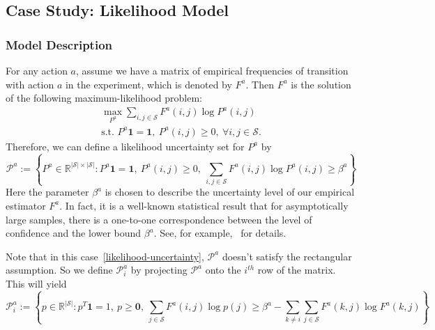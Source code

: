 \documentclass[11pt,reqno]{amsart}
\theoremstyle{definition}
\numberwithin{equation}{section}
\theoremstyle{remark}
\begin{document}

\subsection{Case Study: Likelihood Model}


\subsubsection{Model Description}
For any action $a$, assume we have a matrix of empirical frequencies of transition with action $a$ in the experiment, which is denoted by $F^a$. Then $F^a$ is the solution of the following maximum-likelihood problem:
\begin{equation}
\begin{gathered}
    \max_{P^a}\sum_{i,j\in\mathcal{S}}F^a(i,j)\log P^a(i,j)\\
    \text{s.t. }P^a\textbf{1}=\textbf{1},~P^a(i,j)\geq0,~\forall i,j\in\mathcal{S}.
\end{gathered}
\end{equation}
Therefore, we can define a likelihood uncertainty set for $P^a$ by
\begin{equation}\label{likelihood-uncertainty}
    \mathcal{P}^a:=\left\{P^a\in\mathbb{R}^{|\mathcal{S}|\times|\mathcal{S}|}:P^a\textbf{1}=\textbf{1},~P^a(i,j)\geq0,~\sum_{i,j\in\mathcal{S}}F^a(i,j)\log P^a(i,j)\geq\beta^a\right\}
\end{equation}
Here the parameter $\beta^a$ is chosen to describe the uncertainty level of our empirical estimator $F^a$. In fact, it is a well-known statistical result that for asymptotically large samples, there is a one-to-one correspondence between the level of confidence and the lower bound $\beta^a$. See, for example,~\cite{lehmann2006testing} for details.

\medskip

Note that in this case~\ref{likelihood-uncertainty}, $\mathcal{P}^a$ doesn't satisfy the rectangular assumption. So we define $\mathcal{P}^a_i$ by projecting $\mathcal{P}^a$ onto the $i^{th}$ row of the matrix. This will yield
\begin{equation}\label{likelihood-uncertainty-row}
    \mathcal{P}^a_i:=\left\{p\in\mathbb{R}^{|\mathcal{S}|}:p^T\textbf{1}=1,~p\geq\textbf{0},~\sum_{j\in\mathcal{S}}F^a(i,j)\log p(j)\geq\beta^a-\sum_{k\neq i}\sum_{j\in\mathcal{S}}F^a(k,j)\log F^a(k,j)\right\}
\end{equation}
\end{document}
